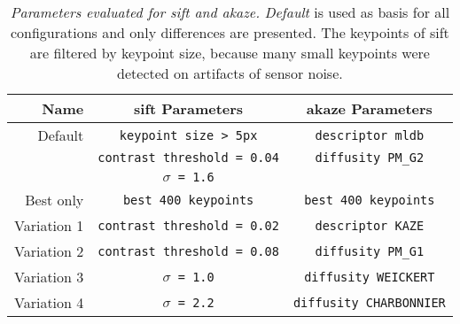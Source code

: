 \begin{table}[H]
    {\renewcommand{\arraystretch}{1.2}%
    \setlength{\tabcolsep}{0.5em}%
    \footnotesize
    \begin{tabular}{rcc}
    \toprule
    \textbf{Name}   & \textbf{\acrshort{sift} Parameters} & \textbf{\acrshort{akaze} Parameters} \\
    \midrule
        Default     & \texttt{keypoint size > 5px}        & \texttt{descriptor \acrshort{mldb}} \\
        \null       & \texttt{contrast threshold = 0.04}  & \texttt{diffusity PM\_G2} \\
        \null       & \texttt{$\sigma$ = 1.6}             & \null \\
        Best only   & \texttt{best 400 keypoints}         & \texttt{best 400 keypoints} \\
        Variation 1 & \texttt{contrast threshold = 0.02}  & \texttt{descriptor KAZE} \\
        Variation 2 & \texttt{contrast threshold = 0.08}  & \texttt{diffusity PM\_G1} \\
        Variation 3 & \texttt{$\sigma$ = 1.0}             & \texttt{diffusity WEICKERT} \\
        Variation 4 & \texttt{$\sigma$ = 2.2}             & \texttt{diffusity CHARBONNIER} \\
    \bottomrule
    \end{tabular}
    }
    \caption[Parameters evaluated for \acrshort{sift} and \acrshort{akaze}]{\emph{Parameters evaluated for \acrshort{sift} and \acrshort{akaze}.} \emph{Default} is used as basis for all configurations and only differences are presented. The keypoints of \acrshort{sift} are filtered by keypoint size, because many small keypoints were detected on artifacts of sensor noise.}
\end{table}
